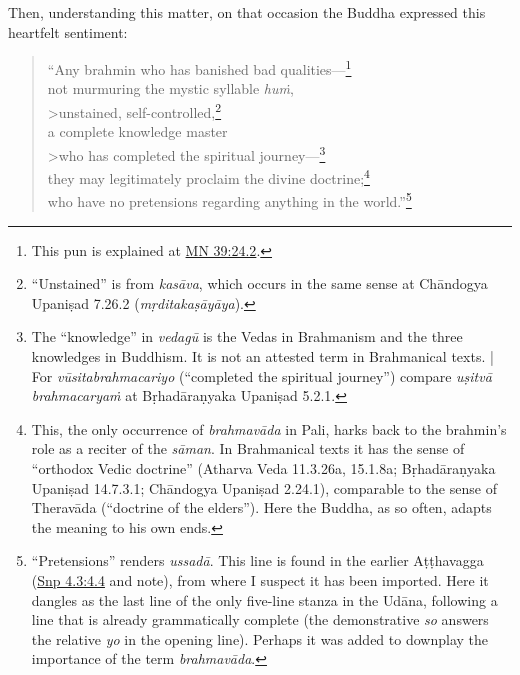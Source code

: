 \documentclass[12pt,openany]{book}%
\begin{document}
Then, understanding this matter, on that occasion the Buddha expressed this heartfelt sentiment: 

\begin{verse}%
“Any brahmin who has banished bad qualities—\footnote{This pun is explained at \href{https://suttacentral.net/mn39/en/sujato\#24.2}{MN 39:24.2}. } \\
not murmuring the mystic syllable \textit{\textsanskrit{huṁ}}, \\>unstained, self-controlled,\footnote{“Unstained” is from \textit{\textsanskrit{kasāva}}, which occurs in the same sense at \textsanskrit{Chāndogya} \textsanskrit{Upaniṣad} 7.26.2 (\textit{\textsanskrit{mṛditakaṣāyāya}}). } \\
a complete knowledge master \\>who has completed the spiritual journey—\footnote{The “knowledge” in \textit{\textsanskrit{vedagū}} is the Vedas in Brahmanism and the three knowledges in Buddhism. It is not an attested term in Brahmanical texts. | For \textit{\textsanskrit{vūsitabrahmacariyo}} (“completed the spiritual journey”) compare \textit{\textsanskrit{uṣitvā} \textsanskrit{brahmacaryaṁ}} at \textsanskrit{Bṛhadāraṇyaka} \textsanskrit{Upaniṣad} 5.2.1. } \\
they may legitimately proclaim the divine doctrine;\footnote{This, the only occurrence of \textit{\textsanskrit{brahmavāda}} in Pali, harks back to the brahmin’s role as a reciter of the \textit{\textsanskrit{sāman}}. In Brahmanical texts it has the sense of “orthodox Vedic doctrine” (Atharva Veda 11.3.26a, 15.1.8a; \textsanskrit{Bṛhadāraṇyaka} \textsanskrit{Upaniṣad} 14.7.3.1; \textsanskrit{Chāndogya} \textsanskrit{Upaniṣad} 2.24.1), comparable to the sense of \textsanskrit{Theravāda} (“doctrine of the elders”). Here the Buddha, as so often, adapts the meaning to his own ends. } \\
who have no pretensions regarding anything in the world.”\footnote{“Pretensions” renders \textit{\textsanskrit{ussadā}}. This line is found in the earlier \textsanskrit{Aṭṭhavagga} (\href{https://suttacentral.net/snp4.3/en/sujato\#4.4}{Snp 4.3:4.4} and note), from where I suspect it has been imported. Here it dangles as the last line of the only five-line stanza in the \textsanskrit{Udāna}, following a line that is already grammatically complete (the demonstrative \textit{so} answers the relative \textit{yo} in the opening line). Perhaps it was added to downplay the importance of the term \textit{\textsanskrit{brahmavāda}}. } 

%
\end{verse}
\end{document}
